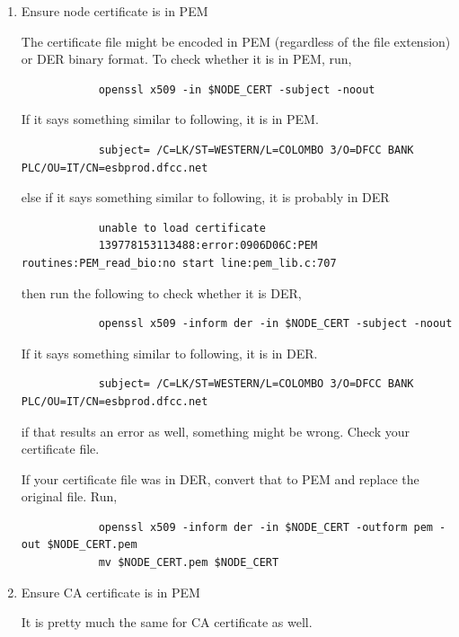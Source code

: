 \documentclass{article}
\begin{document}
    \begin{enumerate}[itemsep=3ex]
        \item Ensure node certificate is in PEM


        The certificate file might be encoded in PEM (regardless of the file extension) or DER binary format. To check whether it is in PEM, run,
        \begin{lstlisting}
            openssl x509 -in $NODE_CERT -subject -noout
        \end{lstlisting}
        If it says something similar to following, it is in PEM.
        \begin{lstlisting}
            subject= /C=LK/ST=WESTERN/L=COLOMBO 3/O=DFCC BANK PLC/OU=IT/CN=esbprod.dfcc.net
        \end{lstlisting}
        else if it says something similar to following, it is probably in DER
        \begin{lstlisting}
            unable to load certificate
            139778153113488:error:0906D06C:PEM routines:PEM_read_bio:no start line:pem_lib.c:707
        \end{lstlisting}
        then run the following to check whether it is DER,
        \begin{lstlisting}
            openssl x509 -inform der -in $NODE_CERT -subject -noout
        \end{lstlisting}
        If it says something similar to following, it is in DER.
        \begin{lstlisting}
            subject= /C=LK/ST=WESTERN/L=COLOMBO 3/O=DFCC BANK PLC/OU=IT/CN=esbprod.dfcc.net
        \end{lstlisting}
        if that results an error as well, something might be wrong. Check your certificate file.

        
        If your certificate file was in DER, convert that to PEM and replace the original file. Run,
        \begin{lstlisting}
            openssl x509 -inform der -in $NODE_CERT -outform pem -out $NODE_CERT.pem
            mv $NODE_CERT.pem $NODE_CERT
        \end{lstlisting}

        \item Ensure CA certificate is in PEM

        It is pretty much the same for CA certificate as well.



\end{enumerate}
\end{document}
